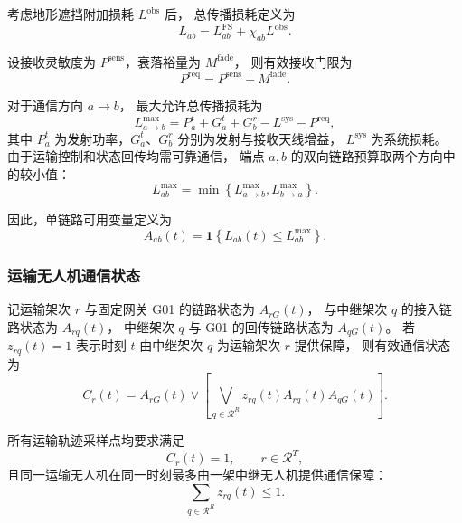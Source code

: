 考虑地形遮挡附加损耗 $L^{\mathrm{obs}}$ 后，
总传播损耗定义为
\begin{equation}
	L_{ab}
	=L_{ab}^{\mathrm{FS}}
	+\chi_{ab}L^{\mathrm{obs}}.
	\label{eq:q3-total-loss}
\end{equation}

设接收灵敏度为 $P^{\mathrm{sens}}$，衰落裕量为 $M^{\mathrm{fade}}$，
则有效接收门限为
\begin{equation}
	P^{\mathrm{req}}
	=P^{\mathrm{sens}}+M^{\mathrm{fade}}.
	\label{eq:q3-receive-threshold}
\end{equation}

对于通信方向 $a\rightarrow b$，
最大允许总传播损耗为
\begin{equation}
	L_{a\rightarrow b}^{\max}
	=P_a^{t}+G_a^{t}+G_b^{r}
	-L^{\mathrm{sys}}-P^{\mathrm{req}},
	\label{eq:q3-oneway-budget}
\end{equation}
其中 $P_a^t$ 为发射功率，$G_a^t$、$G_b^r$ 分别为发射与接收天线增益，
$L^{\mathrm{sys}}$ 为系统损耗。
由于运输控制和状态回传均需可靠通信，
端点 $a,b$ 的双向链路预算取两个方向中的较小值：
\begin{equation}
	L_{ab}^{\max}
	=\min\left\{
	L_{a\rightarrow b}^{\max},
	L_{b\rightarrow a}^{\max}
	\right\}.
	\label{eq:q3-bidirectional-budget}
\end{equation}

因此，单链路可用变量定义为
\begin{equation}
	A_{ab}(t)
	=\mathbf{1}\left\{
	L_{ab}(t)\le L_{ab}^{\max}
	\right\}.
	\label{eq:q3-link-available}
\end{equation}

\subsubsection{运输无人机通信状态}

记运输架次 $r$ 与固定网关 G01 的链路状态为
$A_{rG}(t)$，
与中继架次 $q$ 的接入链路状态为 $A_{rq}(t)$，
中继架次 $q$ 与 G01 的回传链路状态为 $A_{qG}(t)$。
若 $z_{rq}(t)=1$ 表示时刻 $t$ 由中继架次 $q$ 为运输架次 $r$ 提供保障，
则有效通信状态为
\begin{equation}
	C_r(t)
	=A_{rG}(t)
	\vee
	\left[
	\bigvee_{q\in\mathcal{R}^{R}}
	z_{rq}(t)A_{rq}(t)A_{qG}(t)
	\right].
	\label{eq:q3-communication-state}
\end{equation}

所有运输轨迹采样点均要求满足
\begin{equation}
	C_r(t)=1,
	\qquad r\in\mathcal{R}^{T},
	\label{eq:q3-continuous-constraint}
\end{equation}
且同一运输无人机在同一时刻最多由一架中继无人机提供通信保障：
\begin{equation}
	\sum_{q\in\mathcal{R}^{R}}z_{rq}(t)\le 1.
	\label{eq:q3-one-relay}
\end{equation}

